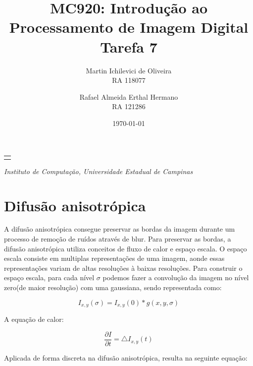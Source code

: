 \documentclass[10pt,a4paper]{article}
\makeatletter
\let\@institution\empty
\def\institution#1{\def\@institution{#1}}
\renewcommand{\maketitle}{
    \begin{center}
        {\Large\bfseries\@title\par\medskip}
        {\large
            \begin{tabular}[t]{c}%
                \@author
        \end{tabular}\par\medskip}
        {\itshape\@institution\par}
        {\itshape\@date\par}
\end{center}}
\makeatother
\begin{document}

\title{MC920: Introdução ao Processamento de Imagem Digital\\Tarefa 7}
\author{
    \begin{minipage}{6cm}
        \centering
        Martin Ichilevici de Oliveira\\
        RA 118077
    \end{minipage}
    \and
    \begin{minipage}{6cm}
        \centering
        Rafael Almeida Erthal Hermano\\
        RA 121286
    \end{minipage}
}
\institution{Instituto de Computação, Universidade Estadual de Campinas}
\date{\today}

\maketitle


\section{Difusão anisotrópica}
A difusão anisotrópica consegue preservar as bordas da imagem durante um processo de remoção de ruídos através de blur.
Para preservar as bordas, a difusão anisotrópica utiliza conceitos de fluxo de calor e espaço escala. O espaço escala consiste em multiplas representações de uma imagem, aonde essas representações variam de altas resoluções à baixas resoluções.
Para construir o espaço escala, para cada nível $\sigma$ podemos fazer a convolução da imagem no nível zero(de maior resolução) com uma gaussiana, sendo representada como:

\begin{equation}
  I_{x,y}(\sigma) = I_{x,y}(0) * g(x,y,\sigma)
  \label{eq:escale_space}
\end{equation}

A equação de calor:

\begin{equation}
  \frac{\partial I}{\partial t} = \bigtriangleup I_{x,y}(t)
  \label{eq:heat_flow}
\end{equation}

Aplicada de forma discreta na difusão anisotrópica, resulta na seguinte equação:
\end{document}
